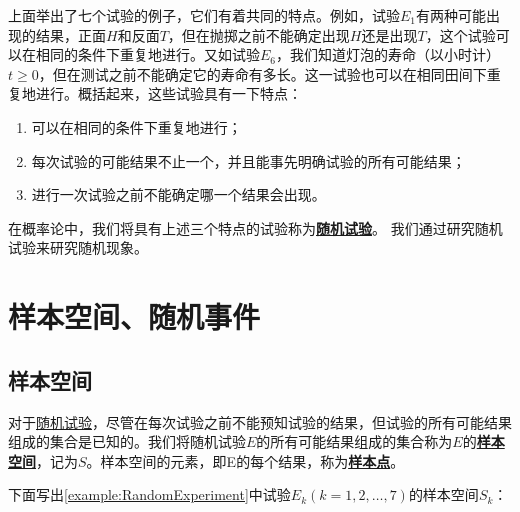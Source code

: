 \documentclass{ctexbook}
\newcommand{\newconcept}[1]{\textbf{\uline{#1}}}
\begin{document}
	上面举出了七个试验的例子，它们有着共同的特点。例如，试验$ E_1 $有两种可能出现的结果，正面$ H $和反面$ T $，但在抛掷之前不能确定出现$ H $还是出现$ T $，这个试验可以在相同的条件下重复地进行。又如试验$ E_6 $，我们知道灯泡的寿命（以小时计）$ t \ge 0 $，但在测试之前不能确定它的寿命有多长。这一试验也可以在相同田间下重复地进行。概括起来，这些试验具有一下特点：
	\begin{enumerate}
		\item 可以在相同的条件下重复地进行；
		\item 每次试验的可能结果不止一个，并且能事先明确试验的所有可能结果；
		\item 进行一次试验之前不能确定哪一个结果会出现。
	\end{enumerate}

在概率论中，我们将具有上述三个特点的试验称为\newconcept{随机试验\label{concept:RandomExperiment}}。
我们通过研究随机试验来研究随机现象。

\section{样本空间、随机事件}

\subsection{样本空间}
对于\hyperref[concept:RandomExperiment]{随机试验}，尽管在每次试验之前不能预知试验的结果，但试验的所有可能结果组成的集合是已知的。我们将随机试验$ E $的所有可能结果组成的集合称为$ E $的\newconcept{样本空间\label{concept:SampleSpace}}，记为$ S $。样本空间的元素，即E的每个结果，称为\newconcept{样本点}。

下面写出\ref{example:RandomExperiment}中试验$ E_k(k=1,2,\dots,7) $的样本空间$ S_k $：
\end{document}
